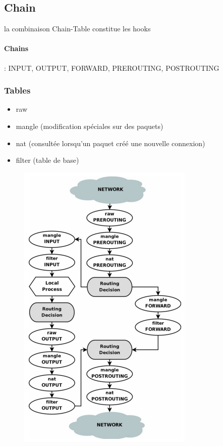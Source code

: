 \documentclass[resume]{subfiles}
\begin{document}
\subsection{Chain}
la combinaison Chain-Table constitue les hooks
\paragraph{Chains} : INPUT, OUTPUT, FORWARD, PREROUTING, POSTROUTING
\subsubsection{Tables}
\begin{itemize}
\item raw
\item mangle (modification spéciales sur des paquets)
\item nat (consultée lorsqu'un paquet créé une nouvelle connexion)
\item filter (table de base)
\end{itemize}
\begin{figure}[H]
\centering
\includegraphics[angle=90,width=\columnwidth]{img_8.png}
\end{figure}
\end{document}
